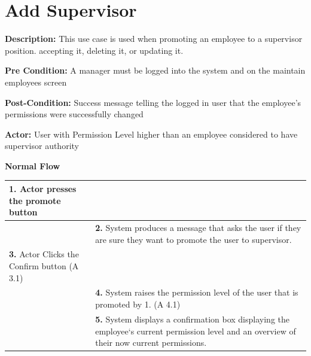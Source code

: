 \documentclass[letterpaper,12pt]{report}
\begin{document}
\section{Add Supervisor}
\begin{description}
 \item \textbf{Description:} \newline This use case is used when promoting an employee to a supervisor position. accepting it, deleting it, or updating it.
 \item \textbf{Pre Condition:} \newline A manager must be logged into the system and on the maintain employees screen
 \item \textbf{Post-Condition:} \newline Success message telling the logged in user that the employee’s permissions were successfully changed
 \item \textbf{Actor:} \newline User with Permission Level higher than an employee considered to have supervisor authority
\end{description}
{\centering \textbf{Normal Flow}
\begin{center}
\xuchead
\begin{tabular}{| p{8.5cm} | p{8.5cm} |}
\hline
\textbf{1.} \index{actor}Actor presses the promote button & \\
\hline
& \textbf{2.} System produces a message that asks the user if they are sure they want to promote the user to supervisor. \\
\hline
\textbf{3.} \index{actor}Actor Clicks the Confirm button (A 3.1) & \\
\hline
& \textbf{4.} System\index{system} raises the permission level of the user that is promoted by 1. (A 4.1) \\
\hline
& \textbf{5.} System displays a confirmation box displaying the employee`s current permission level and an overview of their now current permissions. \\
\hline
\end{tabular}
\end{center}
}
\end{document}
